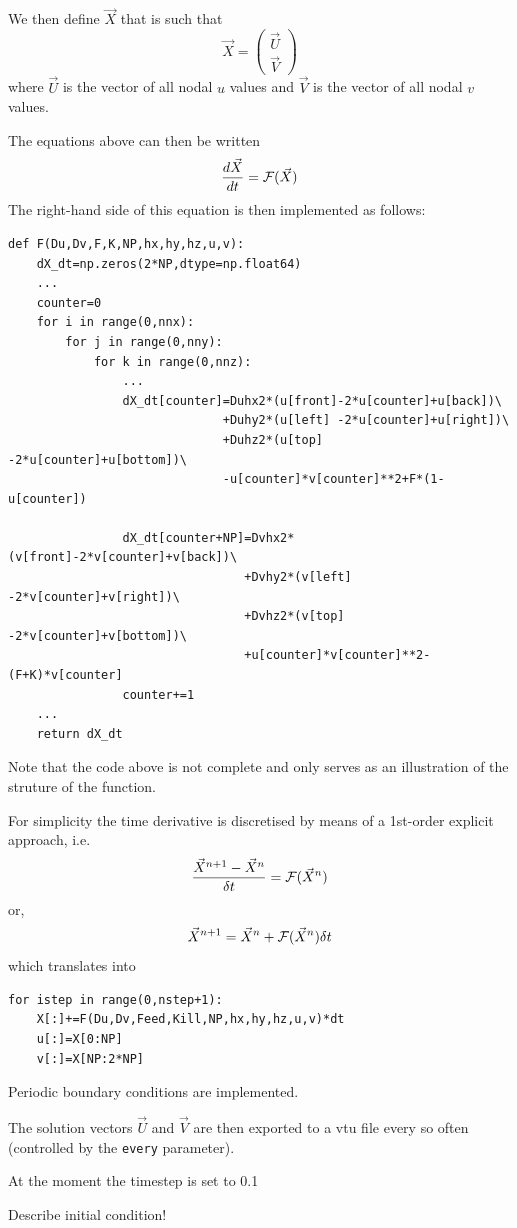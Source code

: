 We then define $\vec{X}$ that is such that 
\[
\vec{X} = 
\left(
\begin{array}{c}
\vec{U} \\ \vec{V}
\end{array}
\right)
\] 
where $\vec{U}$ is the vector of all nodal $u$ values and 
$\vec{V}$ is the vector of all nodal $v$ values.

The equations above can then be written 
\[
\frac{d\vec{X}}{dt} 
= {\cal F} (\vec{X})
\]
The right-hand side of this equation is then implemented as follows:
\begin{lstlisting}
def F(Du,Dv,F,K,NP,hx,hy,hz,u,v):
    dX_dt=np.zeros(2*NP,dtype=np.float64)
    ...
    counter=0
    for i in range(0,nnx):
        for j in range(0,nny):
            for k in range(0,nnz):
                ...
                dX_dt[counter]=Duhx2*(u[front]-2*u[counter]+u[back])\
                              +Duhy2*(u[left] -2*u[counter]+u[right])\
                              +Duhz2*(u[top]  -2*u[counter]+u[bottom])\
                              -u[counter]*v[counter]**2+F*(1-u[counter])

                dX_dt[counter+NP]=Dvhx2*(v[front]-2*v[counter]+v[back])\
                                 +Dvhy2*(v[left] -2*v[counter]+v[right])\
                                 +Dvhz2*(v[top]  -2*v[counter]+v[bottom])\
                                 +u[counter]*v[counter]**2-(F+K)*v[counter]
                counter+=1
    ...
    return dX_dt
\end{lstlisting}
Note that the code above is not complete and only serves as an 
illustration of the struture of the function.

For simplicity the time derivative is discretised by means of a 1st-order
explicit approach, i.e.
\[
\frac{\vec{X}^{n+1} -\vec{X}^{n} }{\delta t} = {\cal F} (\vec{X}^n)
\]
or, 
\[
\vec{X}^{n+1}
=
\vec{X}^{n} + {\cal F} (\vec{X}^n) \delta t
\]
which translates into
\begin{lstlisting}
for istep in range(0,nstep+1):
    X[:]+=F(Du,Dv,Feed,Kill,NP,hx,hy,hz,u,v)*dt
    u[:]=X[0:NP]
    v[:]=X[NP:2*NP]
\end{lstlisting}
Periodic boundary conditions are implemented.

The solution vectors $\vec{U}$ and $\vec{V}$ are then exported to 
a vtu file every so often (controlled by the \lstinline{every} parameter).

At the moment the timestep is set to 0.1

Describe initial condition!

